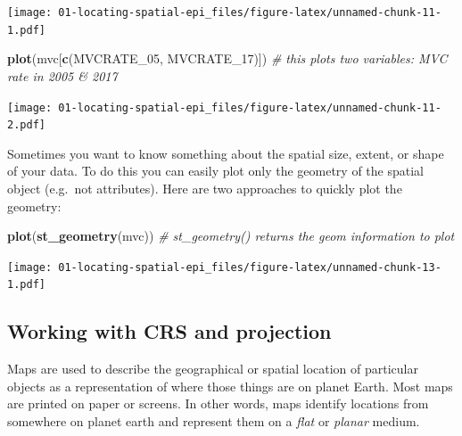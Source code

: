 \documentclass[
]{book}
\newenvironment{Shaded}{\begin{snugshade}}{\end{snugshade}}
\newcommand{\CommentTok}[1]{\textcolor[rgb]{0.56,0.35,0.01}{\textit{#1}}}
\newcommand{\FunctionTok}[1]{\textcolor[rgb]{0.13,0.29,0.53}{\textbf{#1}}}
\newcommand{\NormalTok}[1]{#1}
\newcommand{\SpecialCharTok}[1]{\textcolor[rgb]{0.81,0.36,0.00}{\textbf{#1}}}
\newcommand{\StringTok}[1]{\textcolor[rgb]{0.31,0.60,0.02}{#1}}
\begin{document}
\texttt{[image: 01-locating-spatial-epi\_files/figure-latex/unnamed-chunk-11-1.pdf]}

\begin{Shaded}
\begin{Highlighting}[]
\FunctionTok{plot}\NormalTok{(mvc[}\FunctionTok{c}\NormalTok{(}\StringTok{\textquotesingle{}MVCRATE\_05\textquotesingle{}}\NormalTok{, }\StringTok{\textquotesingle{}MVCRATE\_17\textquotesingle{}}\NormalTok{)]) }\CommentTok{\# this plots two variables: MVC rate in 2005 \& 2017}
\end{Highlighting}
\end{Shaded}

\texttt{[image: 01-locating-spatial-epi\_files/figure-latex/unnamed-chunk-11-2.pdf]}

Sometimes you want to know something about the spatial size, extent, or shape of your data. To do this you can easily plot only the geometry of the spatial object (e.g.~not attributes). Here are two approaches to quickly plot the geometry:

\begin{Shaded}
\begin{Highlighting}[]
\FunctionTok{plot}\NormalTok{(}\FunctionTok{st\_geometry}\NormalTok{(mvc)) }\CommentTok{\# st\_geometry() returns the geom information to plot}
\end{Highlighting}
\end{Shaded}

\begin{Shaded}
\end{Shaded}

\texttt{[image: 01-locating-spatial-epi\_files/figure-latex/unnamed-chunk-13-1.pdf]}

\hypertarget{working-with-crs-and-projection}{%
\subsection{Working with CRS and projection}\label{working-with-crs-and-projection}}

Maps are used to describe the geographical or spatial location of particular objects as a representation of where those things are on planet Earth. Most maps are printed on paper or screens. In other words, maps identify locations from somewhere on planet earth and represent them on a \emph{flat} or \emph{planar} medium.
\end{document}
